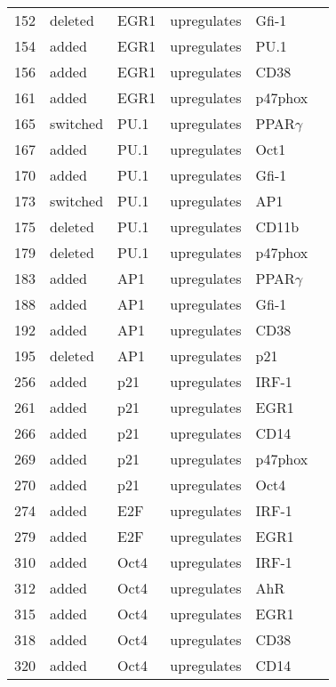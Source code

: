 \begin{center}
\begin{scriptsize}
\begin{supertabular}{|p{2 cm}|p{2cm}|p{3cm}|p{2.5cm}|p{2cm}|p{1.5cm}|}
152 &  deleted &  EGR1  & upregulates &  Gfi-1 & \\
154 &  added &  EGR1  & upregulates &  PU.1 & \cite{Friedman2002}\\
156 &  added &  EGR1  & upregulates &  CD38 & \\
161 &  added &  EGR1  & upregulates &  p47phox & \\
165 &  switched &  PU.1  & upregulates &  PPAR$\gamma$ & \\
167 &  added &  PU.1  & upregulates &  Oct1 & \\
170 &  added &  PU.1  & upregulates &  Gfi-1 & \\
173 &  switched &  PU.1  & upregulates &  AP1 & \\
175 &  deleted &  PU.1  & upregulates &  CD11b & \\
179 &  deleted &  PU.1  & upregulates &  p47phox & \\
183 &  added &  AP1  & upregulates &  PPAR$\gamma$ & \cite{Wang2002}\\
188 &  added &  AP1  & upregulates &  Gfi-1 & \\
192 &  added &  AP1  & upregulates &  CD38 & \\
195 &  deleted &  AP1  & upregulates &  p21 & \\
256 &  added &  p21  & upregulates &  IRF-1 & \\
261 &  added &  p21  & upregulates &  EGR1 & \\
266 &  added &  p21  & upregulates &  CD14 & \\
269 &  added &  p21  & upregulates &  p47phox & \\
270 &  added &  p21  & upregulates &  Oct4 & \\
274 &  added &  E2F  & upregulates &  IRF-1 & \\
279 &  added &  E2F  & upregulates &  EGR1 & \\
310 &  added &  Oct4  & upregulates &  IRF-1 & \\
312 &  added &  Oct4  & upregulates &  AhR & \\
315 &  added &  Oct4  & upregulates &  EGR1 & \\
318 &  added &  Oct4  & upregulates &  CD38 & \\
320 &  added &  Oct4  & upregulates &  CD14	& \\ 

\hline
\end{supertabular}
\end{scriptsize}
\end{center}
%






